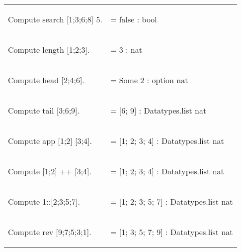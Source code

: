 \hspace{-1cm}
\begin{tabular}{p{8cm} p{8cm}}
\begin{code}	Compute search [1;3;6;8] 5.		\end{code}	
&
\begin{msg}	= false     : bool					\end{msg}
\\	
\begin{code}	Compute length [1;2;3].			\end{code}
&
\begin{msg}	= 3     : nat					\end{msg}
\\
\begin{code}	Compute head [2;4;6].			\end{code}
&
\begin{msg}	= Some 2     : option nat			\end{msg}
\\
\begin{code}	Compute tail [3;6;9].				\end{code}
&
\begin{msg}	= [6; 9]     : Datatypes.list nat		\end{msg}
\\
\begin{code}	Compute app [1;2] [3;4].			\end{code}
&
\begin{msg}	= [1; 2; 3; 4]     : Datatypes.list nat	\end{msg}
\\
\begin{code}	Compute [1;2] ++ [3;4].			\end{code}
&
\begin{msg}	= [1; 2; 3; 4]     : Datatypes.list nat	\end{msg}
\\
\begin{code}	Compute 1::[2;3;5;7].				\end{code}
&
\begin{msg}	= [1; 2; 3; 5; 7]     : Datatypes.list nat	\end{msg}
\\
\begin{code}	Compute rev [9;7;5;3;1].			\end{code}
&
\begin{msg}	= [1; 3; 5; 7; 9]     : Datatypes.list nat	\end{msg}
\end{tabular}

